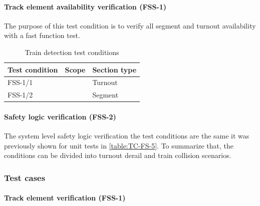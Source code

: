 \paragraph{Track element availability verification (FSS-1)} The purpose of this test condition is to verify all segment and turnout availability with a fast function test. 
\begin{table}[H]
	\caption{Train detection test conditions}
	\label{table:TC-FSS-1}
	\begin{center}
		\renewcommand{\arraystretch}{1.8}
		\begin{tabu} 
			to 0.9 \textwidth
			{  X[c] X[c] X[c] }
			\toprule
			Test condition & Scope                      & Section type \\ \midrule
			FSS-1/1        &  & Turnout      \\
			FSS-1/2        &                            & Segment      \\ \bottomrule
		\end{tabu}
	\end{center}
\end{table} 
\paragraph{Safety logic verification (FSS-2)} The system level safety logic verification the test conditions are the same it was previously shown for unit tests in \autoref{table:TC-FS-5}. To summarize that, the conditions can be divided into turnout derail and train collision scenarios. 

\subsubsection{Test cases}
\paragraph{Track element verification (FSS-1)}

